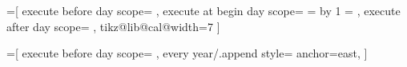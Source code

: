 \documentclass{article}
\begin{document}
    \makeatletter


    =[
        execute before day scope={%
        },
        execute at begin day scope={%
            \pgfmathsetlength\pgf@x{\tikz@lib@cal@xshift}%
            \ifnum{}
            \else
                \c@pgf@counta=\pgfcalendarcurrentweekday
                \advance\c@pgf@counta by 1
            \fi
            \pgf@x=\c@pgf@counta\pgf@x
            \pgftransformxshift{\pgf@x}
        },
        execute after day scope={
        },
        tikz@lib@cal@width=7
    ]

    =[
        execute before day scope={
        },
        every year/.append style={
            anchor=east,
        }
    ]

\end{document}
